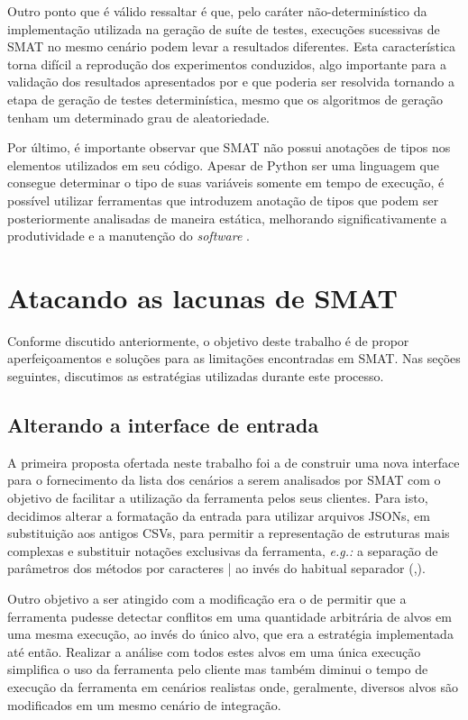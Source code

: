 \documentclass[12pt]{article}
\begin{document}
Outro ponto que é válido ressaltar é que, pelo caráter não-determinístico da implementação utilizada na geração de suíte de testes, execuções sucessivas de SMAT no mesmo cenário podem levar a resultados diferentes. Esta característica torna difícil a reprodução dos experimentos conduzidos, algo importante para a validação dos resultados apresentados por \cite{leuson:icsme} e que poderia ser resolvida tornando a etapa de geração de testes determinística, mesmo que os algoritmos de geração tenham um determinado grau de aleatoriedade.

Por último, é importante observar que SMAT não possui anotações de tipos nos elementos utilizados em seu código. Apesar de Python ser uma linguagem que consegue determinar o tipo de suas variáveis somente em tempo de execução, é possível utilizar ferramentas que introduzem anotação de tipos \cite{lehtosalo2021mypy} que podem ser posteriormente analisadas de maneira estática, melhorando significativamente a produtividade \cite{hanenberg2009impact} e a manutenção do \textit{software} \cite{kleinschmager2012static}.

\section{Atacando as lacunas de SMAT}
Conforme discutido anteriormente, o objetivo deste trabalho é de propor aperfeiçoamentos e soluções para as limitações encontradas em SMAT. Nas seções seguintes, discutimos as estratégias utilizadas durante este processo.

\subsection{Alterando a interface de entrada}
A primeira proposta ofertada neste trabalho foi a de construir uma nova interface para o fornecimento da lista dos cenários a serem analisados por SMAT com o objetivo de facilitar a utilização da ferramenta pelos seus clientes. Para isto, decidimos alterar a formatação da entrada para utilizar arquivos JSONs, em substituição aos antigos CSVs, para permitir a representação de estruturas mais complexas e substituir notações exclusivas da ferramenta, \textit{e.g.:} a separação de parâmetros dos métodos por caracteres | ao invés do habitual separador (,).

Outro objetivo a ser atingido com a modificação era o de permitir que a ferramenta pudesse detectar conflitos em uma quantidade arbitrária de alvos em uma mesma execução, ao invés do único alvo, que era a estratégia implementada até então. Realizar a análise com todos estes alvos em uma única execução simplifica o uso da ferramenta pelo cliente mas também diminui o tempo de execução da ferramenta em cenários realistas onde, geralmente, diversos alvos são modificados em um mesmo cenário de integração.
\end{document}
